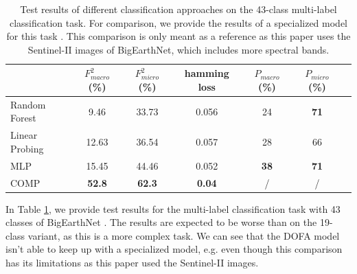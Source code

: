 \begin{table}[h]
  \centering
  \begin{tabular}{lcccccc}
    \textbf{} & \textbf{$F^2_{macro}$ (\%)} & \textbf{$F^2_{micro}$ (\%)} & \textbf{hamming loss} & \textbf{$P_{macro}$ (\%)} & \textbf{$P_{micro}$ (\%)} \\
    \hline
    Random Forest & 9.46 & 33.73 & 0.056 & 24 & \textbf{71} \\
    Linear Probing & 12.63 & 36.54 & 0.057 & 28 & 66 \\
    MLP & 15.45 & 44.46 & 0.052 & \textbf{38} & \textbf{71} \\
    \hline
    COMP \cite{bigearthnet-comparison-model} & \textbf{52.8} & \textbf{62.3} & \textbf{0.04} & / & / \\
  \end{tabular}
  \caption{Test results of different classification approaches on the 43-class multi-label classification task. For comparison, we provide the results of a specialized model for this task \cite{bigearthnet-comparison-model}. This comparison is only meant as a reference as this paper uses the Sentinel-II images of BigEarthNet, which includes more spectral bands.}
  \label{fig:test-results-43}
\end{table}

In Table \ref{fig:test-results-43}, we provide test results for the multi-label classification task with 43 classes of BigEarthNet \cite{bigearthnet}. The results are expected to be worse than on the 19-class variant, as this is a more complex task. We can see that the DOFA model isn't able to keep up with a specialized model, e.g. \cite{bigearthnet-comparison-model} even though this comparison has its limitations as this paper used the Sentinel-II images.

